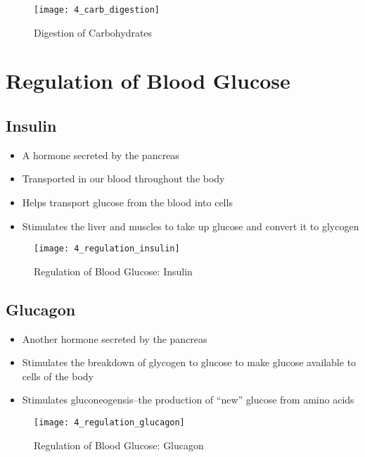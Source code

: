 \documentclass[title={Chapter 4}]{fdsn201notes}
\begin{document}
\begin{figure}[H]
	\centering
	\texttt{[image: 4\_carb\_digestion]}
	\caption{Digestion of Carbohydrates}
	\label{fig:digestion-of-carbohydrates}
\end{figure}

\section{Regulation of Blood Glucose}\label{sec:regulation-of-blood-glucose}
\subsection{Insulin}\label{subsec:regulation-of-blood-glucose-insulin}
\begin{itemize}
	\item A hormone secreted by the pancreas
	\item Transported in our blood throughout the body
	\item Helps transport glucose from the blood into cells
	\item Stimulates the liver and muscles to take up glucose and convert it to glycogen
\end{itemize}

\begin{figure}[H]
	\centering
	\texttt{[image: 4\_regulation\_insulin]}
	\caption{Regulation of Blood Glucose: Insulin}
	\label{fig:Regulation-of-Blood-Glucose-Insulin}
\end{figure}

\subsection{Glucagon}\label{subsec:regulation-of-blood-glucose-glucagon}
\begin{itemize}
	\item Another hormone secreted by the pancreas
	\item Stimulates the breakdown of glycogen to glucose to make glucose available to cells of the body
	\item Stimulates gluconeogensis\label{dfn:gluconeogensis}--the production of ``new'' glucose from amino acids
\end{itemize}

\begin{figure}[H]
	\centering
	\texttt{[image: 4\_regulation\_glucagon]}
	\caption{Regulation of Blood Glucose: Glucagon}
	\label{fig:Regulation-of-Blood-Glucose-Glucagon}
\end{figure}
\end{document}
